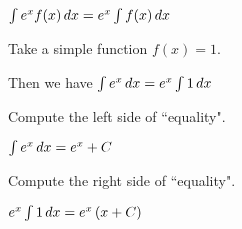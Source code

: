 \documentclass{ximera}
\author{Steven Gubkin}
\begin{document}
\begin{exercise}

$\int e^x f(x) \mathop{}\!d x= e^x \int f(x) \mathop{}\!d x$
\begin{hint}
Take a simple function $f(x)=1$. 

Then we have
$\int e^x  \mathop{}\!d x= e^x \int1 \mathop{}\!d x$

Compute the left  side of ``equality".

$ \int e^x \mathop{}\!d x=e^x+C$

Compute the right  side of ``equality".

$e^x \int1 \mathop{}\!d x=e^x\left(x+C\right)$
\end{hint}
	\begin{multipleChoice}	
	\end{multipleChoice}

\end{exercise}
\end{document}
